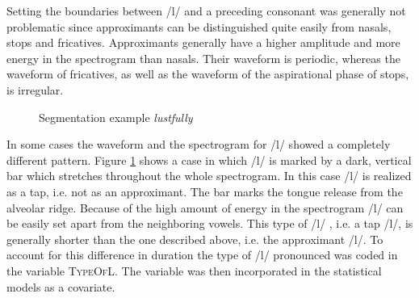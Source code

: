 Setting the boundaries between /l/ and a preceding consonant was generally not problematic since approximants can be distinguished quite easily from nasals, stops and fricatives. Approximants generally have a  higher amplitude and more energy in the spectrogram than nasals. Their waveform is periodic, whereas the waveform of fricatives, as well as the waveform of the aspirational phase of stops, is irregular.



\begin{figure} [t!]
	
	\caption{Segmentation example \textit{lustfully}}
	\label{fig:segmentation lustfully}
\end{figure}


In some cases the waveform and the spectrogram for /l/ showed a completely different pattern. Figure \ref{fig:segmentation lustfully} shows a case in which /l/ is marked by a dark, vertical bar which stretches throughout the whole spectrogram. In this case /l/ is realized as a tap, i.e. not as an approximant. The bar marks the tongue release from the alveolar ridge. Because of the high amount of energy in the spectrogram /l/ can be easily set apart  from the neighboring vowels. This type of /l/ , i.e. a tap /l/, is generally shorter than the one described above, i.e. the approximant /l/. To account for this difference in duration the type of /l/ pronounced was coded in the variable \textsc{TypeOfL}. The variable was then incorporated in the statistical models as a covariate.\\




